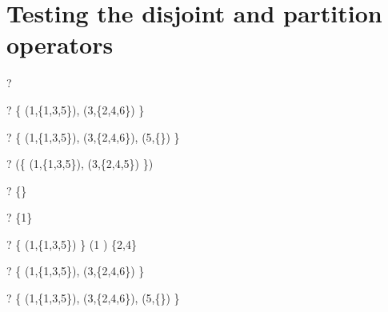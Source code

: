 \documentclass{article}
\begin{document}
\section{Testing the disjoint and partition operators}
\begin{zed} \vdash? \disjoint \emptyset[\power\nat] \end{zed}
\begin{zed} \vdash? \disjoint \{ (1,\{1,3,5\}), (3,\{2,4,6\}) \} \end{zed}
\begin{zed} \vdash? \disjoint \{ (1,\{1,3,5\}), (3,\{2,4,6\}), (5,\{\}) \} \end{zed}
\begin{zed} \vdash? \lnot (\disjoint \{ (1,\{1,3,5\}), (3,\{2,4,5\}) \}) \end{zed}

\begin{zed} \vdash? \emptyset[\power\nat] \partition \{\} \end{zed}
\begin{zed} \vdash? \lnot \emptyset[\power\nat] \partition \{1\} \end{zed}
\begin{zed} \vdash? \{ (1,\{1,3,5\}) \} \partition (1 ) \setminus \{2,4\} \end{zed}
\begin{zed} \vdash? \{ (1,\{1,3,5\}), (3,\{2,4,6\}) \}   \end{zed}
\begin{zed} \vdash? \{ (1,\{1,3,5\}), (3,\{2,4,6\}), (5,\{\}) \}   \end{zed}
\end{document}

